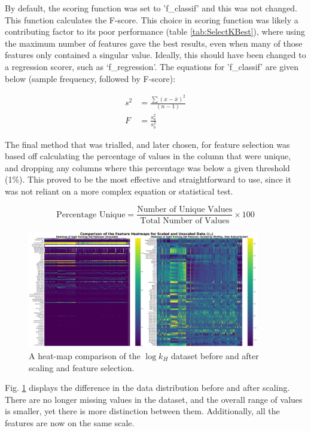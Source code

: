 \documentclass[11pt, titlepage]{article}
\begin{document}
By default, the scoring function was set to 'f\_classif' and this was not changed. This function calculates the F-score. This choice in scoring function was likely a contributing factor to its poor performance (table \ref{tab:SelectKBest}), where using the maximum number of features gave the best results, even when many of those features only contained a singular value. Ideally, this should have been changed to a regression scorer, such as `f\_regression'. The equations\cite{fstat} for 'f\_classif' are given below (sample frequency, followed by F-score):

\begin{align}
	s^2 &= \frac{\sum(x-\bar{x})^2}{(n-1) \label{eq:sampleFreq}}\\
	F &= \frac{s^2_a}{s^2_b} \label{eq:fscore}
\end{align}

The final method that was trialled, and later chosen, for feature selection was based off calculating the percentage of values in the column that were unique, and dropping any columns where this percentage was below a given threshold (1\%). This proved to be the most effective and straightforward to use, since it was not reliant on a more complex equation or statistical test.

\begin{equation}
	\text{Percentage Unique} = \frac{\text{Number of Unique Values}}{\text{Total Number of Values}} \times 100
\end{equation}

\begin{figure}[H]
	\centering
	\small
	\includegraphics[width=0.9\textwidth]{figures/HeatmapScalingComparison.png}
	\caption{A heat-map comparison of the $\log k_H$ dataset before and after scaling and feature selection.}
	\label{fig:HeatmapScalingComparison}
\end{figure}

Fig. \ref{fig:HeatmapScalingComparison} displays the difference in the data distribution before and after scaling. There are no longer missing values in the dataset, and the overall range of values is smaller, yet there is more distinction between them. Additionally, all the features are now on the same scale.
\end{document}

